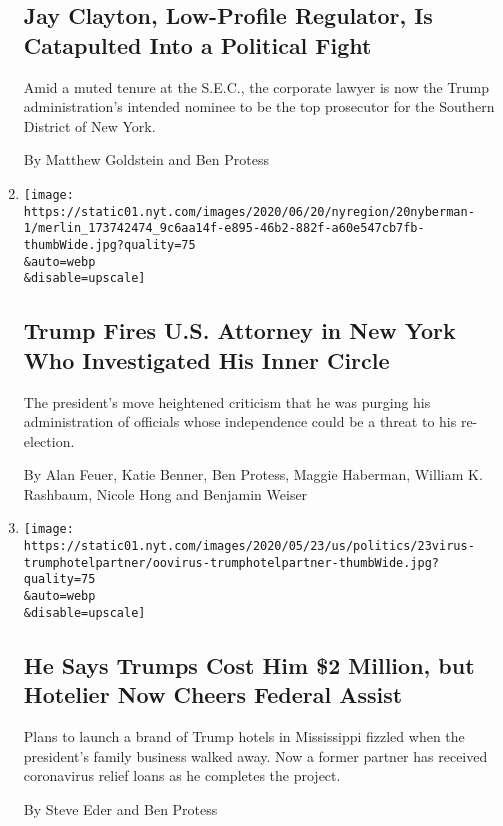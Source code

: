 \begin{enumerate}
  \hypertarget{jay-clayton-low-profile-regulator-is-catapulted-into-a-political-fight}{%
  \subsection{Jay Clayton, Low-Profile Regulator, Is Catapulted Into a
  Political
  Fight}\label{jay-clayton-low-profile-regulator-is-catapulted-into-a-political-fight}}

  Amid a muted tenure at the S.E.C., the corporate lawyer is now the
  Trump administration's intended nominee to be the top prosecutor for
  the Southern District of New York.

  By Matthew Goldstein and Ben Protess
\item
  \href{/2020/06/20/nyregion/trump-geoffrey-berman-fired-sdny.html}{}

  \texttt{[image: https://static01.nyt.com/images/2020/06/20/nyregion/20nyberman-1/merlin\_173742474\_9c6aa14f-e895-46b2-882f-a60e547cb7fb-thumbWide.jpg?quality=75\\\&auto=webp\\\&disable=upscale]}

  \hypertarget{trump-fires-us-attorney-in-new-york-who-investigated-his-inner-circle}{%
  \subsection{Trump Fires U.S. Attorney in New York Who Investigated His
  Inner
  Circle}\label{trump-fires-us-attorney-in-new-york-who-investigated-his-inner-circle}}

  The president's move heightened criticism that he was purging his
  administration of officials whose independence could be a threat to
  his re-election.

  By Alan Feuer, Katie Benner, Ben Protess, Maggie Haberman, William K.
  Rashbaum, Nicole Hong and Benjamin Weiser
\item
  \href{/2020/05/22/us/hotel-coronavirus-trump.html}{}

  \texttt{[image: https://static01.nyt.com/images/2020/05/23/us/politics/23virus-trumphotelpartner/oovirus-trumphotelpartner-thumbWide.jpg?quality=75\\\&auto=webp\\\&disable=upscale]}

  \hypertarget{he-says-trumps-cost-him-2-million-but-hotelier-now-cheers-federal-assist}{%
  \subsection{He Says Trumps Cost Him \$2 Million, but Hotelier Now
  Cheers Federal
  Assist}\label{he-says-trumps-cost-him-2-million-but-hotelier-now-cheers-federal-assist}}

  Plans to launch a brand of Trump hotels in Mississippi fizzled when
  the president's family business walked away. Now a former partner has
  received coronavirus relief loans as he completes the project.

  By Steve Eder and Ben Protess
\end{enumerate}

